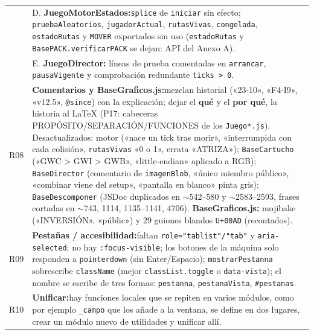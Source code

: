 \begin{xltabular}{\textwidth}{l >{\RaggedRight\arraybackslash}X}
		& D. \textbf{JuegoMotorEstados:}\newline \texttt{splice} de \texttt{iniciar} sin efecto; \texttt{pruebaAleatorios}, \texttt{jugadorActual}, \texttt{rutasVivas}, \texttt{congelada}, \texttt{estadoRutas} y \texttt{MOVER} exportados sin uso (\texttt{estadoRutas} y \texttt{BasePACK.verificarPACK} se dejan: API del Anexo A). \\
		
		& E. \textbf{JuegoDirector:} líneas de prueba comentadas en \texttt{arrancar}, \texttt{pausaVigente} y comprobación redundante \texttt{ticks > 0}. \\
	
	\midrule
	
	R08 & \textbf{Comentarios y BaseGraficos.js:}\newline mezclan historial («23-10», «F4-I9», «v12.5», \texttt{@since}) con la explicación; dejar el \textbf{qué} y el \textbf{por qué}, la historia al LaTeX (P17: cabeceras PROPÓSITO/SEPARACIÓN/FUNCIONES de los \texttt{Juego*.js}). Desactualizados: motor («nace un tick tras morir», «interrumpida con cada colisión», \texttt{rutasVivas} «0 o 1», errata «ATRIZA»); \texttt{BaseCartucho} («GWC > GWI > GWB», «little-endian» aplicado a RGB); \texttt{BaseDirector} (comentario de \texttt{imagenBlob}, «único miembro público», «combinar viene del setup», «pantalla en blanco» pinta gris); \texttt{BaseDescomponer} (JSDoc duplicados en $\sim$542--580 y $\sim$2583--2593, frases cortadas en $\sim$743, 1114, 1135--1141, 4706). \textbf{BaseGraficos.js:} mojibake («INVERSIÓN», «públic») y 29 guiones blandos \texttt{U+00AD} (recontados). \\
	\midrule
	
	R09 & \textbf{Pestañas / accesibilidad:}\newline faltan \texttt{role="tablist"/"tab"} y \texttt{aria-selected}; no hay \texttt{:focus-visible}; los botones de la máquina solo responden a \texttt{pointerdown} (sin Enter/Espacio); \texttt{mostrarPestanna} sobrescribe \texttt{className} (mejor \texttt{classList.toggle} o \texttt{data-vista}); el nombre se escribe de tres formas: \texttt{pestanna}, \texttt{pestanaVista}, \texttt{\#pestanas}. \\
	\midrule
	
	R10 & \textbf{Unificar:}\newline hay funciones locales que se repiten en varios módulos, como por ejemplo \texttt{\_campo} que los añade a la ventana, se define en dos lugares, crear un módulo nuevo de utilidades y unificar allí. \\
	
	\bottomrule
\end{xltabular}
\clearpage

